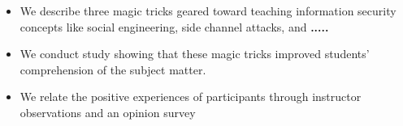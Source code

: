 \begin{itemize}

\item{We describe three magic tricks geared toward teaching
information security concepts like social engineering, side channel attacks, and
\textbf{.....}}

\item{We conduct study showing that these magic tricks improved students'
comprehension of the subject matter.}

\item{We relate the positive experiences of participants through instructor
observations and an opinion survey}

\end{itemize}
